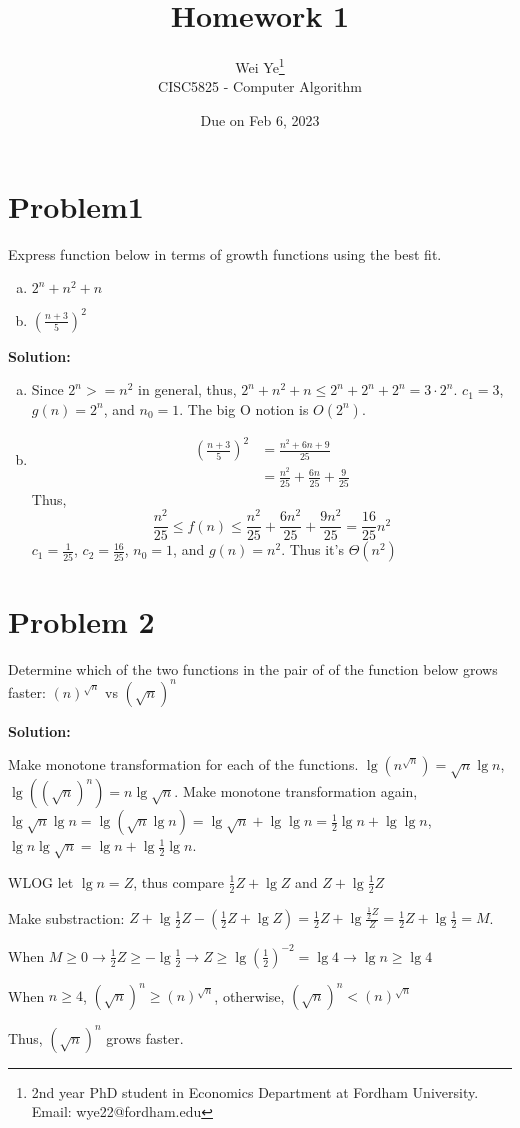 \documentclass[11pt]{article} %
\title{Homework 1}
\author{Wei Ye\footnote{2nd year PhD student in Economics Department at Fordham University. Email: wye22@fordham.edu}
    \\ CISC5825 - Computer Algorithm}
\date{Due on Feb 6, 2023}
\begin{document}
\maketitle

\section*{Problem1}
Express function below in terms of growth functions using the best fit.
\begin{enumerate}[a)]
    \item $2^n + n^2 + n$
    \item $(\frac{n+3}{5})^2$
\end{enumerate}
\textbf{Solution:}
\begin{enumerate}[a)]
    \item Since $2^n >= n^2$ in general, thus, $2^n +n^2 + n \leq 2^n + 2^n + 2^n = 3 \cdot 2^n$. $c_1 = 3$, $g(n)= 2^n$, and $n_0 = 1$. The big O notion is $O(2^n)$.
    \item \begin{align*}
        (\frac{n+3}{5})^2 &= \frac{n^2 + 6n + 9}{25}\\
                         &= \frac{n^2}{25} + \frac{6n}{25} + \frac{9}{25}
    \end{align*}
    Thus,
    \begin{equation*}
        \frac{n^2}{25}\leq f(n) \leq \frac{n^2}{25} + \frac{6n^2}{25} + \frac{9n^2}{25}= \frac{16}{25}n^2
    \end{equation*}
    $c_1 = \frac{1}{25}$, $c_2 = \frac{16}{25}$, $n_0 = 1$, and $g(n) = n^2$. Thus it's $\Theta(n^2)$
\end{enumerate}




\section*{Problem 2}
Determine which of the two functions in the pair of of the function below grows faster: $(n)^{\sqrt{n}}$ vs $(\sqrt{n})^n$

\textbf{Solution:}

Make monotone transformation for each of the functions. $\lg(n^{\sqrt{n}})= \sqrt{n}\lg n$, $\lg ((\sqrt{n})^n)= n\lg \sqrt{n}$. Make monotone transformation again,
$\lg \sqrt{n}\lg n = \lg (\sqrt{n}\lg n) = \lg \sqrt{n} + \lg\lg n = \frac{1}{2}\lg n + \lg \lg n$, $\lg n\lg \sqrt{n} = \lg n + \lg \frac{1}{2}\lg n$. 

WLOG let $\lg n = Z$, thus compare $\frac{1}{2}Z + \lg Z $ and $Z+ \lg \frac{1}{2}Z$

Make substraction: $Z+ \lg \frac{1}{2}Z -(\frac{1}{2}Z + \lg Z) = \frac{1}{2}Z +\lg \frac{\frac{1}{2}Z}{Z} = \frac{1}{2}Z +\lg \frac{1}{2} = M$.

When $M \geq 0 \rightarrow \frac{1}{2}Z \geq -\lg \frac{1}{2}  \rightarrow Z \geq \lg (\frac{1}{2})^{-2} = \lg 4 \rightarrow \lg n \geq \lg 4$

When $n \geq 4 $, $(\sqrt{n})^n \geq (n)^{\sqrt{n}}$, otherwise, $(\sqrt{n})^n < (n)^{\sqrt{n}}$

Thus, $(\sqrt{n})^n$ grows faster.
\end{document}
